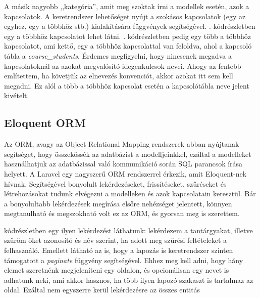 \documentclass[
]{thesis-ekf}
\theoremstyle{definition}
\theoremstyle{remark}
\begin{document}
A másik nagyobb ,,kategória'', amit meg szoktak írni a modellek esetén, azok a kapcsolatok. A keretrendszer lehetőséget nyújt a szokásos kapcsolatok (egy az egyhez, egy a többhöz stb.) kialakítására függvények segítségével. . kódrészletben egy a többhöz kapcsolatot lehet látni. . kódrészletben pedig egy több a többhöz kapcsolatot, ami kettő, egy a többhöz kapcsolattal van feloldva, ahol a kapcsoló tábla a \emph{course\_students}. Érdemes megfigyelni, hogy nincsenek megadva a kapcsolatoknál az azokat megvalósító idegenkulcsok nevei. Ahogy az fentebb említettem, ha követjük az elnevezés konvenciót, akkor azokat itt sem kell megadni. Ez alól a több a többhöz kapcsolat esetén a kapcsolótábla neve jelent kivételt.




\subsection{Eloquent ORM}

Az ORM, avagy az Object Relational Mapping rendszerek abban nyújtanak segítséget, hogy összekössék az adatbázist a modelljeinkkel, ezáltal a modelleket használhatjuk az adatbázissal való kommunikáció során SQL parancsok írása helyett.\cite{orm} A Laravel egy nagyszerű ORM rendszerrel érkezik, amit Eloquent-nek\cite{eloquentORM} hívnak. Segítségével bonyolult lekérdezéseket, frissítéseket, szűréseket és létrehozásokat tudunk elvégezni a modelleken és azok kapcsolatain keresztül. Bár a bonyolultabb lekérdezések megírása elsőre nehézséget jelentett, könnyen megtanulható és megszokható volt ez az ORM, és gyorsan meg is szerettem.

 kódrészletben egy ilyen lekérdezést láthatunk: lekérdezem a tantárgyakat, illetve szűröm őket azonosító és név szerint, ha adott meg szűrési feltételeket a felhasználó. Emellett látható az is, hogy a lapozás is keretrendszer szinten támogatott a \emph{paginate} függvény segítségével. Ehhez meg kell adni, hogy hány elemet szeretnénk megjeleníteni egy oldalon, és opcionálisan egy nevet is adhatunk neki, ami akkor hasznos, ha több ilyen lapozó szakaszt is tartalmaz az oldal. Ezáltal nem egyszerre kerül lekérdezésre az összes entitás
\end{document}
